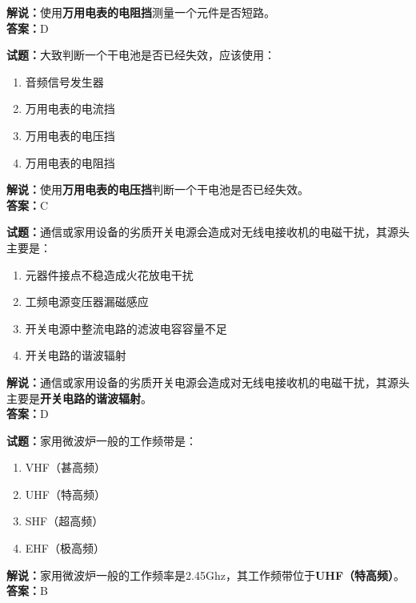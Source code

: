 \documentclass{ctexbook}
\begin{document}
\noindent\textbf{解说：}使用\textbf{万用电表的电阻挡}测量一个元件是否短路。\\\noindent\textbf{答案：}D

\bigskip


\noindent\textbf{试题：}大致判断一个干电池是否已经失效，应该使用：

\begin{enumerate}[leftmargin=3em]
	\item 音频信号发生器
	\item 万用电表的电流挡
	\item 万用电表的电压挡
	\item 万用电表的电阻挡
\end{enumerate}

\noindent\textbf{解说：}使用\textbf{万用电表的电压挡}判断一个干电池是否已经失效。\\\noindent\textbf{答案：}C

\bigskip


\noindent\textbf{试题：}通信或家用设备的劣质开关电源会造成对无线电接收机的电磁干扰，其源头主要是：

\begin{enumerate}[leftmargin=3em]
	\item 元器件接点不稳造成火花放电干扰
	\item 工频电源变压器漏磁感应
	\item 开关电源中整流电路的滤波电容容量不足
	\item 开关电路的谐波辐射
\end{enumerate}

\noindent\textbf{解说：}通信或家用设备的劣质开关电源会造成对无线电接收机的电磁干扰，其源头主要是\textbf{开关电路的谐波辐射}。\\\noindent\textbf{答案：}D

\bigskip


\noindent\textbf{试题：}家用微波炉一般的工作频带是：

\begin{enumerate}[leftmargin=3em]
	\item VHF（甚高频）
	\item UHF（特高频）
	\item SHF（超高频）
	\item EHF（极高频）
\end{enumerate}

\noindent\textbf{解说：}家用微波炉一般的工作频率是2.45Ghz，其工作频带位于\textbf{UHF（特高频）}。\\\noindent\textbf{答案：}B
\end{document}
